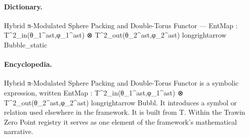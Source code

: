 \paragraph{Dictionary.}
Hybrid π-Modulated Sphere Packing and Double-Torus Functor — EntMap : T\textasciicircum{}2\_in(θ\_1\textasciicircum{}ast,φ\_1\textasciicircum{}ast) ⊗ T\textasciicircum{}2\_out(θ\_2\textasciicircum{}ast,φ\_2\textasciicircum{}ast) longrightarrow Bubble\_static

\paragraph{Encyclopedia.}
Hybrid π-Modulated Sphere Packing and Double-Torus Functor is a symbolic expression, written EntMap : T\textasciicircum{}2\_in(θ\_1\textasciicircum{}ast,φ\_1\textasciicircum{}ast) ⊗ T\textasciicircum{}2\_out(θ\_2\textasciicircum{}ast,φ\_2\textasciicircum{}ast) longrightarrow Bubbl. It introduces a symbol or relation used elsewhere in the framework. It is built from T. Within the Trawin Zero Point registry it serves as one element of the framework's mathematical narrative.
